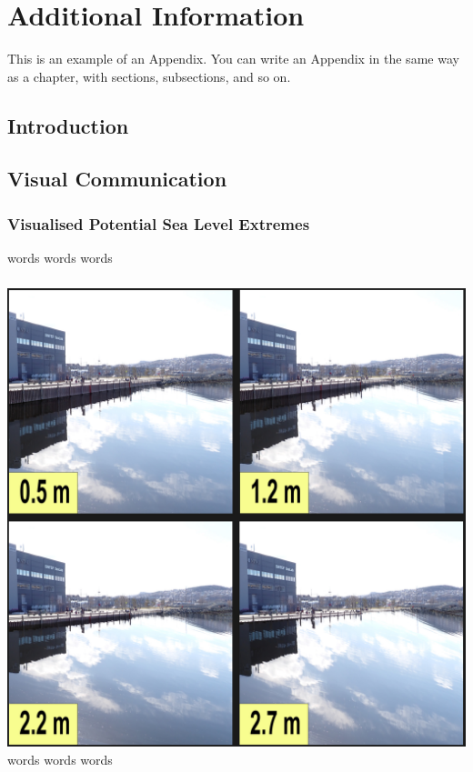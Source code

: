 
\chapter{Additional Information}
This is an example of an Appendix. You can write an Appendix in the same way as a chapter, with sections, subsections, and so on.

\section{Introduction}

\section{Visual Communication}



\subsection{Visualised Potential Sea Level Extremes}
words words words
\paragraph{}
\includegraphics[scale=0.3]{fig_appendix/brattora 2022 q.png}
words words words
